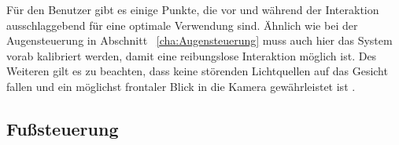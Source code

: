 \newline
Für den Benutzer gibt es einige Punkte, die vor und während der Interaktion ausschlaggebend für eine optimale Verwendung sind. Ähnlich wie bei der Augensteuerung in Abschnitt ~\ref{cha:Augensteuerung} muss auch hier das System vorab kalibriert werden, damit eine reibungslose Interaktion möglich ist. Des Weiteren gilt es zu beachten, dass keine störenden Lichtquellen auf das Gesicht fallen und ein möglichst frontaler Blick in die Kamera gewährleistet ist \cite{MouthChinaControl}.
%
%
%
%

\subsection{Fußsteuerung}

